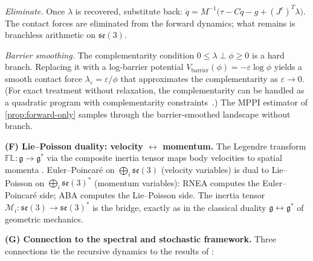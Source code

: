\documentclass[12pt]{amsart}
\theoremstyle{definition}
\theoremstyle{remark}
\newcommand{\cM}{\mathcal{M}}
\begin{document}
\medskip\noindent\emph{Eliminate.}
Once $\lambda$ is recovered, substitute back:
$\ddot{q} = M^{-1}\bigl(\tau - C\dot{q} - g + (J^c)^T\lambda\bigr)$.
The contact forces are eliminated from the forward dynamics; what
remains is branchless arithmetic on $\mathfrak{se}(3)$.

\medskip\noindent\emph{Barrier smoothing.}
The complementarity condition $0 \leq \lambda \perp \phi \geq 0$ is a
hard branch.
Replacing it with a log-barrier potential
$V_{\mathrm{barrier}}(\phi) = -\varepsilon\log\phi$ yields a smooth
contact force $\lambda_\varepsilon = \varepsilon / \phi$ that
approximates the complementarity as $\varepsilon \to 0$.
(For exact treatment without relaxation, the complementarity can be
handled as a quadratic program with complementarity
constraints~\cite{MenagerCarpentier2025}.)
The MPPI estimator of \cref{prop:forward-only} samples through the barrier-smoothed
landscape without branch.

\medskip\noindent\textbf{(F) Lie--Poisson duality: velocity
$\leftrightarrow$ momentum.}
The Legendre transform $\mathbb{FL}: \mathfrak{g} \to \mathfrak{g}^*$ via the
composite inertia tensor maps body velocities to spatial momenta
\cite{MarsdenRatiu}.
Euler--Poincar\'e on $\bigoplus_i \mathfrak{se}(3)$ (velocity variables) is
dual to Lie--Poisson on $\bigoplus_i \mathfrak{se}(3)^*$ (momentum
variables):
RNEA computes the Euler--Poincar\'e side; ABA computes the Lie--Poisson side.
The inertia tensor
$\cM_i : \mathfrak{se}(3) \to \mathfrak{se}(3)^*$ is the bridge, exactly as
in the classical duality $\mathfrak{g} \leftrightarrow \mathfrak{g}^*$ of
geometric mechanics.

\medskip\noindent\textbf{(G) Connection to the spectral and
stochastic framework.}
Three connections tie the recursive dynamics to the results of \cite{OCT}:
\end{document}
